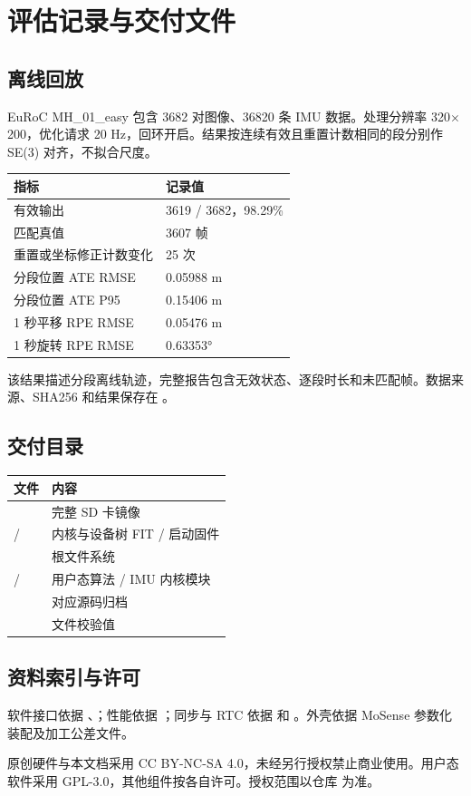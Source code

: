 \section{评估记录与交付文件}
\subsection{离线回放}
EuRoC MH\_01\_easy 包含 3682 对图像、36820 条 IMU 数据。处理分辨率 320$\times$200，优化请求 20 Hz，回环开启。结果按连续有效且重置计数相同的段分别作 SE(3) 对齐，不拟合尺度。
\par\noindent\begin{tabularx}{\linewidth}{@{}YY@{}}\toprule
指标 & 记录值\\\midrule
有效输出 & 3619 / 3682，98.29\%\\
匹配真值 & 3607 帧\\
重置或坐标修正计数变化 & 25 次\\
分段位置 ATE RMSE & 0.05988 m\\
分段位置 ATE P95 & 0.15406 m\\
1 秒平移 RPE RMSE & 0.05476 m\\
1 秒旋转 RPE RMSE & 0.63353°\\\bottomrule
\end{tabularx}\par

该结果描述分段离线轨迹，完整报告包含无效状态、逐段时长和未匹配帧。数据来源、SHA256 和结果保存在 。

\subsection{交付目录}
\par\noindent\begin{tabularx}{\linewidth}{@{}p{60mm}Y@{}}\toprule
文件 & 内容\\\midrule
{} & 完整 SD 卡镜像\\
 /  & 内核与设备树 FIT / 启动固件\\
 & 根文件系统\\
 /  & 用户态算法 / IMU 内核模块\\
 & 对应源码归档\\
 & 文件校验值\\\bottomrule
\end{tabularx}\par

\subsection{资料索引与许可}
软件接口依据 、；性能依据 ；同步与 RTC 依据  和 。外壳依据 MoSense 参数化装配及加工公差文件。

原创硬件与本文档采用 CC BY-NC-SA 4.0，未经另行授权禁止商业使用。用户态软件采用 GPL-3.0，其他组件按各自许可。授权范围以仓库  为准。


